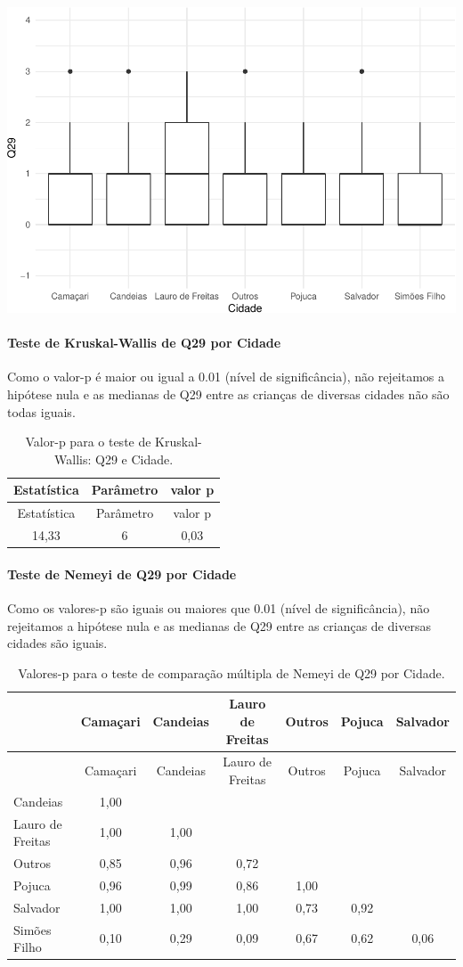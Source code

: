 \documentclass[]{article}
\let\oldparagraph\paragraph
\renewcommand{\paragraph}[1]{\oldparagraph{#1}\mbox{}}
\begin{document}
\begin{center}\includegraphics[width=0.75\linewidth]{relatorio_covid19_files/figure-latex/unnamed-chunk-902-1} \end{center}

\hypertarget{teste-de-kruskal-wallis-de-q29-por-cidade}{%
\paragraph{Teste de Kruskal-Wallis de Q29 por Cidade}\label{teste-de-kruskal-wallis-de-q29-por-cidade}}

Como o valor-p é maior ou igual a 0.01 (nível de significância), não rejeitamos a hipótese nula e as medianas de Q29 entre as crianças de diversas cidades não são todas iguais.

\begin{longtable}[]{@{}ccc@{}}
\caption{\label{tab:unnamed-chunk-904}Valor-p para o teste de Kruskal-Wallis: Q29 e Cidade.}\tabularnewline
\toprule
Estatística & Parâmetro & valor p\tabularnewline
\midrule
\endfirsthead
\toprule
Estatística & Parâmetro & valor p\tabularnewline
\midrule
\endhead
14,33 & 6 & 0,03\tabularnewline
\bottomrule
\end{longtable}

\hypertarget{teste-de-nemeyi-de-q29-por-cidade}{%
\paragraph{Teste de Nemeyi de Q29 por Cidade}\label{teste-de-nemeyi-de-q29-por-cidade}}

Como os valores-p são iguais ou maiores que 0.01 (nível de significância), não rejeitamos a hipótese nula e as medianas de Q29 entre as crianças de diversas cidades são iguais.

\begin{longtable}[]{@{}lcccccc@{}}
\caption{\label{tab:unnamed-chunk-906}Valores-p para o teste de comparação múltipla de Nemeyi de Q29 por Cidade.}\tabularnewline
\toprule
& Camaçari & Candeias & Lauro de Freitas & Outros & Pojuca & Salvador\tabularnewline
\midrule
\endfirsthead
\toprule
& Camaçari & Candeias & Lauro de Freitas & Outros & Pojuca & Salvador\tabularnewline
\midrule
\endhead
Candeias & 1,00 & & & & &\tabularnewline
Lauro de Freitas & 1,00 & 1,00 & & & &\tabularnewline
Outros & 0,85 & 0,96 & 0,72 & & &\tabularnewline
Pojuca & 0,96 & 0,99 & 0,86 & 1,00 & &\tabularnewline
Salvador & 1,00 & 1,00 & 1,00 & 0,73 & 0,92 &\tabularnewline
Simões Filho & 0,10 & 0,29 & 0,09 & 0,67 & 0,62 & 0,06\tabularnewline
\bottomrule
\end{longtable}
\end{document}
